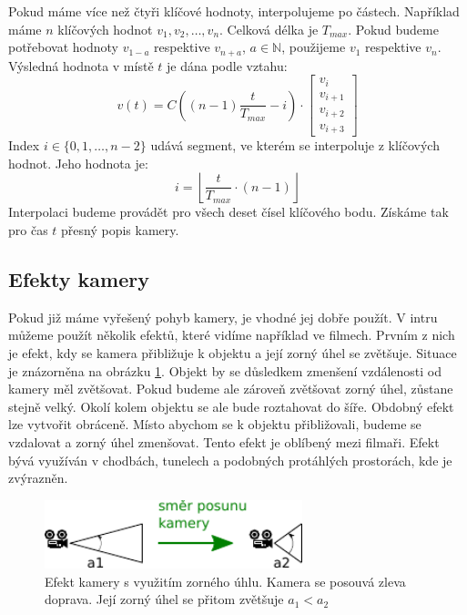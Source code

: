Pokud máme více než čtyři klíčové hodnoty, interpolujeme po částech.
Například máme $n$ klíčových hodnot $v_1,v_2,\dotsc,v_n$.
Celková délka je $T_{max}$.
Pokud budeme potřebovat hodnoty $v_{1-a}$ respektive $v_{n+a}$, $a \in \mathbb{N}$, použijeme $v_1$ respektive $v_n$.
Výsledná hodnota v místě $t$ je dána podle vztahu:
\begin{equation}
v(t)=C \left((n-1)\frac{t}{T_{max}}-i\right)\cdot
\left[
\begin{array}{c}
v_{i} \\
v_{i+1} \\
v_{i+2} \\
v_{i+3} 
\end{array}
\right]
\end{equation}
Index $i \in \{0,1,\dotsc,n-2\}$ udává segment, ve kterém se interpoluje z klíčových hodnot.
Jeho hodnota je:
\begin{equation}
i=\left \lfloor \frac{t}{T_{max}} \cdot (n-1) \right \rfloor
\end{equation}
Interpolaci budeme provádět pro všech deset čísel klíčového bodu.
Získáme tak pro čas $t$ přesný popis kamery.

\subsection{Efekty kamery}
Pokud již máme vyřešený pohyb kamery, je vhodné jej dobře použít.
V intru můžeme použít několik efektů, které vidíme například ve filmech.
Prvním z nich je efekt, kdy se kamera přibližuje k objektu a její zorný úhel se zvětšuje.
Situace je znázorněna na obrázku \ref{fig:kamera0}.
Objekt by se důsledkem zmenšení vzdálenosti od kamery měl zvětšovat.
Pokud budeme ale zároveň zvětšovat zorný úhel, zůstane stejně velký.
Okolí kolem objektu se ale bude roztahovat do šíře.
Obdobný efekt lze vytvořit obráceně.
Místo abychom se k objektu přibližovali, budeme se vzdalovat a zorný úhel zmenšovat.
Tento efekt je oblíbený mezi filmaři.
Efekt bývá využíván v chodbách, tunelech a podobných protáhlých prostorách, kde je zvýrazněn.
\begin{figure}[h]
\centering
\includegraphics[width=7.5cm,keepaspectratio]{obr/kamera0.pdf}
\caption{Efekt kamery s využitím zorného úhlu.
Kamera se posouvá zleva doprava.
Její zorný úhel se přitom zvětšuje $a_1<a_2$}
\label{fig:kamera0}
\end{figure}

